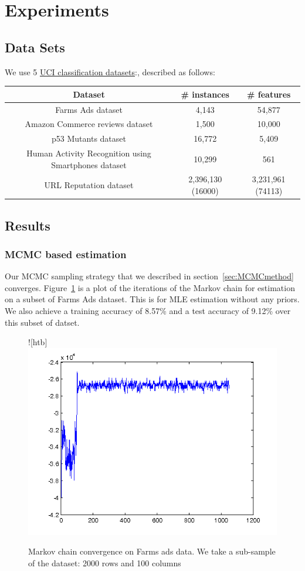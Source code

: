 \section{Experiments}
\label{sec:experiments}

\subsection{Data Sets}


We use 5 \href{http://archive.ics.uci.edu/ml/datasets.html}{UCI classification
datasets}:, described as follows:

\begin{tabular}{| c | c |  c |}
\hline
Dataset & \# instances & \# features \\
\hline
Farms Ads dataset & 4,143 & 54,877 \\
\hline
Amazon Commerce reviews dataset & 1,500 & 10,000 \\
\hline
p53 Mutants dataset & 16,772 & 5,409 \\
\hline
Human Activity Recognition using Smartphones dataset & 10,299 & 561\\
\hline
URL Reputation dataset\footnotemark[1] & 2,396,130 (16000) & 3,231,961 (74113) \\
\hline
\end{tabular}


\subsection{Results}

\subsubsection{MCMC based estimation}
Our MCMC sampling strategy that we described in section~\ref{sec:MCMCmethod}
converges. Figure~\ref{fig:MCMCconverge} is a plot of the iterations of the Markov 
chain for estimation on a subset of Farms Ads dataset. This is for MLE
estimation without any priors. We also achieve a training  accuracy of 8.57\%
and a test accuracy of 9.12\% over this subset of datset.  

\begin{figure}![htb]
\includegraphics[width=1\textwidth]{samplingConvergence.png}
\caption{Markov chain convergence on Farms ads data. We take a sub-sample of
the dataset: 2000 rows and 100 columns}
\label{fig:MCMCconverge}
\end{figure}
